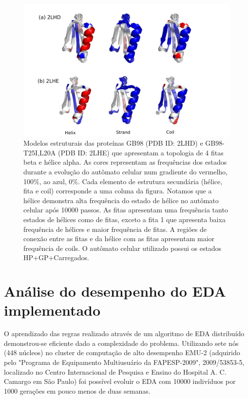 \begin{figure}
  \centering
  \includegraphics[width=1\textwidth]{figures/camel_2lhd_2lhe.pdf}
  \caption{Modelos estruturais das proteínas GB98 (PDB ID: 2LHD) e GB98-T25I,L20A (PDB ID: 2LHE) que apresentam a topologia de 4 fitas beta e hélice alpha. As cores representam as frequências dos estados durante a evolução do autômato celular num gradiente do vermelho, 100\%, ao azul, 0\%. Cada elemento de estrutura secundária (hélice, fita e coil) corresponde a uma coluna da figura. Notamos que a hélice demonstra alta frequência do estado de hélice no autômato celular após 10000 passos. As fitas apresentam uma frequência tanto estados de hélices como de fitas, exceto a fita 1 que apresenta baixa frequência de hélices e maior frequência de fitas. A regiões de conexão entre as fitas e da hélice com as fitas apresentam maior frequência de coils. O autômato celular utilizado possui os estados HP+GP+Carregados.}
        \label{fig:camel_2lhd_2lhe}
\end{figure}


\section{Análise do desempenho do EDA implementado}

O aprendizado das regras realizado através de um algoritmo de EDA distribuído demonstrou-se eficiente dado a complexidade do problema. Utilizando sete nós (448 núcleos) no cluster de computação de alto desempenho EMU-2 (adquirido pelo "Programa de Equipamento  Multiusuário da FAPESP-2009", 2009/53853-5, localizado no Centro Internacional de Pesquisa e Ensino do Hospital A. C. Camargo em  São Paulo) foi possível evoluir o EDA com 10000 indivíduos por 1000 gerações em pouco menos de duas semanas.


